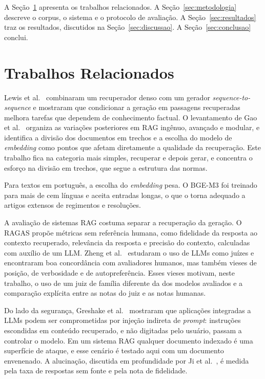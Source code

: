 \documentclass{sbc-template}
\begin{document}
A Seção~\ref{sec:relacionados} apresenta os trabalhos relacionados. A
Seção~\ref{sec:metodologia} descreve o corpus, o sistema e o protocolo de avaliação. A
Seção~\ref{sec:resultados} traz os resultados, discutidos na
Seção~\ref{sec:discussao}. A Seção~\ref{sec:conclusao} conclui.

\section{Trabalhos Relacionados}
\label{sec:relacionados}

Lewis et al.~\cite{Lewis2020} combinaram um recuperador denso com um gerador
\textit{sequence-to-sequence} e mostraram que condicionar a geração em passagens
recuperadas melhora tarefas que dependem de conhecimento factual. O levantamento de
Gao et al.~\cite{Gao2023} organiza as variações posteriores em RAG ingênuo, avançado e
modular, e identifica a divisão dos documentos em trechos e a escolha do modelo de
\textit{embedding} como pontos que afetam diretamente a qualidade da recuperação. Este
trabalho fica na categoria mais simples, recuperar e depois gerar, e concentra o
esforço na divisão em trechos, que segue a estrutura das normas.

Para textos em português, a escolha do \textit{embedding} pesa. O BGE-M3
\cite{Chen2024} foi treinado para mais de cem línguas e aceita entradas longas, o que o
torna adequado a artigos extensos de regimentos e resoluções.

A avaliação de sistemas RAG costuma separar a recuperação da geração. O RAGAS
\cite{Es2023} propõe métricas sem referência humana, como fidelidade da resposta ao
contexto recuperado, relevância da resposta e precisão do contexto, calculadas com
auxílio de um LLM. Zheng et al.~\cite{Zheng2023} estudaram o uso de LLMs como juízes e
encontraram boa concordância com avaliadores humanos, mas também vieses de posição, de
verbosidade e de autopreferência. Esses vieses motivam, neste trabalho, o uso de um
juiz de família diferente da dos modelos avaliados e a comparação explícita entre as
notas do juiz e as notas humanas.

Do lado da segurança, Greshake et al.~\cite{Greshake2023} mostraram que aplicações integradas a
LLMs podem ser comprometidas por injeção indireta de \textit{prompt}: instruções
escondidas em conteúdo recuperado, e não digitadas pelo usuário, passam a controlar o
modelo. Em um sistema RAG qualquer documento indexado é uma superfície de ataque, e
esse cenário é testado aqui com um documento envenenado. A alucinação, discutida em
profundidade por Ji et al.~\cite{Ji2023}, é medida pela taxa de respostas sem fonte e pela
nota de fidelidade.
\end{document}
